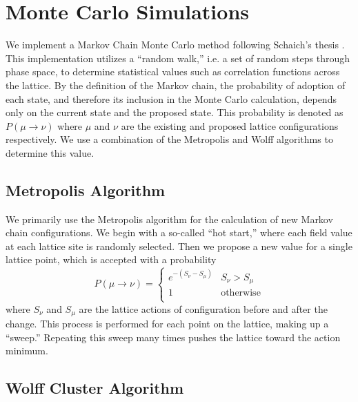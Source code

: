 \documentclass[12pt]{report}
\begin{document}
\section{Monte Carlo Simulations}
\label{sec:mc}

We implement a Markov Chain Monte Carlo method following Schaich's thesis \cite{schaich2006}. This implementation utilizes a ``random walk,'' i.e. a set of random steps through phase space, to determine statistical values such as correlation functions across the lattice. By the definition of the Markov chain, the probability of adoption of each state, and therefore its inclusion in the Monte Carlo calculation, depends only on the current state and the proposed state. This probability is denoted as $P(\mu\rightarrow\nu)$ where $\mu$ and $\nu$ are the existing and proposed lattice configurations respectively. We use a combination of the Metropolis and Wolff algorithms to determine this value.

\subsection{Metropolis Algorithm}
We primarily use the Metropolis algorithm for the calculation of new Markov chain configurations. We begin with a so-called ``hot start,'' where each field value at each lattice site is randomly selected. Then we propose a new value for a single lattice point, which is accepted with a probability
\begin{equation}
    P(\mu\rightarrow\nu) = \begin{cases} 
        e^{-(S_\nu - S_\mu)} & S_\nu > S_\mu \\
        1 & \mathrm{otherwise} \\
   \end{cases}
\end{equation}
where $S_\nu$ and $S_\mu$ are the lattice actions of configuration before and after the change. This process is performed for each point on the lattice, making up a ``sweep.'' Repeating this sweep many times pushes the lattice toward the action minimum.

\subsection{Wolff Cluster Algorithm}
\end{document}
